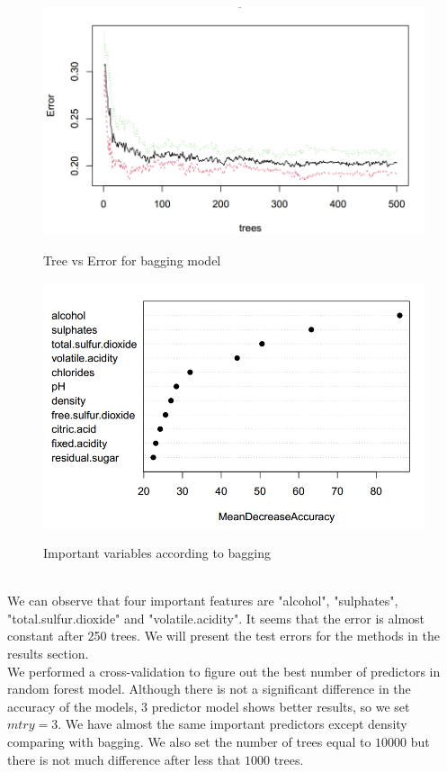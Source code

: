 \documentclass{article}
\begin{document}
\begin{figure}[H]
\begin{minipage}[]{.5\textwidth}
    \centering
    \includegraphics[scale=0.6]{Bagging1.PNG}
    \label{fig:Bagging1}
    \caption{Tree vs Error for bagging model}
\end{minipage}
\hspace{0.5cm}
\begin{minipage}[]{.5\textwidth}
    \centering
    \includegraphics[scale=0.6]{Bagging2.PNG}
    \label{fig:Bagging2}
    \caption{Important variables according to bagging}
\end{minipage}
\end{figure}


\
\\We can observe that four important features are "alcohol", "sulphates", "total.sulfur.dioxide" and "volatile.acidity". It seems that the error is almost constant after 250 trees. We will present the test errors for the methods in the results section.\\
We performed a cross-validation to figure out the best number of predictors in random forest model. Although there is not a significant difference in the accuracy of the models, $3$ predictor model shows better results, so we set $mtry=3$. We have almost the same important predictors except density comparing with bagging. We also set the number of trees equal to $10000$ but there is not much difference after less that $1000$ trees.
\end{document}

